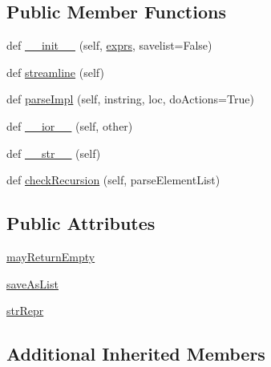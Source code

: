 \subsection*{Public Member Functions}
\begin{DoxyCompactItemize}
\item 
def \hyperlink{classpyparsing_1_1MatchFirst_a8e4cc704504d71c63f42e6f3204065ba}{\+\_\+\+\_\+init\+\_\+\+\_\+} (self, \hyperlink{classpyparsing_1_1ParseExpression_a18a085fff96b65ee97761c3bf27d3675}{exprs}, savelist=False)
\item 
def \hyperlink{classpyparsing_1_1MatchFirst_a5ee1b08f086cd05ca1f3d0589ed268fa}{streamline} (self)
\item 
def \hyperlink{classpyparsing_1_1MatchFirst_a4e6eda7edefa47ddfd0605d8da833ed0}{parse\+Impl} (self, instring, loc, do\+Actions=True)
\item 
def \hyperlink{classpyparsing_1_1MatchFirst_abee3216bd410a1a6cabe45fa611ad8de}{\+\_\+\+\_\+ior\+\_\+\+\_\+} (self, other)
\item 
def \hyperlink{classpyparsing_1_1MatchFirst_ac51b5abd1b59bac6e7e988e875e1dfa5}{\+\_\+\+\_\+str\+\_\+\+\_\+} (self)
\item 
def \hyperlink{classpyparsing_1_1MatchFirst_ab24ad3f633492c7ab7f605dc7c384125}{check\+Recursion} (self, parse\+Element\+List)
\end{DoxyCompactItemize}
\subsection*{Public Attributes}
\begin{DoxyCompactItemize}
\item 
\hyperlink{classpyparsing_1_1MatchFirst_aae665cc89ac9ab17f23828c539200ab7}{may\+Return\+Empty}
\item 
\hyperlink{classpyparsing_1_1MatchFirst_aff85c6ac19ffd175c90de5e3352c7e04}{save\+As\+List}
\item 
\hyperlink{classpyparsing_1_1MatchFirst_ae529d692983ab536ff066185cb864fa1}{str\+Repr}
\end{DoxyCompactItemize}
\subsection*{Additional Inherited Members}


